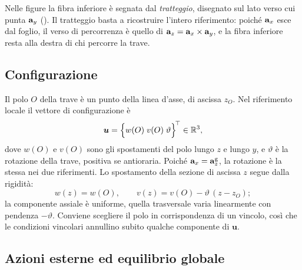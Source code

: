 Nelle figure la fibra inferiore è segnata dal
\emph{tratteggio}, disegnato sul lato verso cui punta
$\mathbf{a}_y$ (). Il
tratteggio basta a ricostruire l'intero riferimento:
poiché $\mathbf{a}_x$ esce dal foglio, il verso di percorrenza
è quello di $\mathbf{a}_z = \mathbf{a}_x \times \mathbf{a}_y$, e la fibra
inferiore resta alla destra di chi percorre la trave.





\subsection{Configurazione}
\label{sec:polo_trave}

Il polo $O$ della trave è un punto della linea d'asse,
di ascissa $z_O$. Nel riferimento locale il vettore di
configurazione è
\begin{equation}\label{eq:conf_trave}
	\bm{u} =
	\Bigl\{w(O)\; v(O) \; \vartheta\Bigr\}^{\!\top}
	\in \mathbb{R}^3,
\end{equation}
dove $w(O)$ e $v(O)$ sono gli spostamenti del polo lungo
$z$ e lungo $y$, e $\vartheta$ è la rotazione della trave,
positiva se antioraria. Poiché $\mathbf{a}_x = \mathbf{a}_z^{\mathrm{g}}$,
la rotazione è la stessa nei due riferimenti. Lo
spostamento della sezione di ascissa $z$ segue dalla
rigidità:
\begin{equation}\label{eq:cinematica_trave}
	w(z) = w(O),
	\qquad
	v(z) = v(O) - \vartheta\,(z - z_O);
\end{equation}
la componente assiale è uniforme, quella trasversale
varia linearmente con pendenza $-\vartheta$. Conviene
scegliere il polo in corrispondenza di un vincolo, così
che le condizioni vincolari annullino subito qualche
componente di $\bm{u}$.



\subsection{Azioni esterne ed equilibrio globale}
\label{sec:azioni_esterne}

